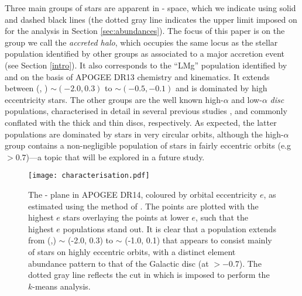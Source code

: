Three main groups of stars are apparent in \mgfe{}-\feh{} space,
which we indicate using solid and dashed black lines (the dotted
gray line indicates the upper limit imposed on \feh{} for the
analysis in Section \ref{sec:abundances}).  The focus of this paper
is on the group we call the \textit{accreted halo}, which occupies
the same locus as the stellar population identified by other groups
as associated to a major accretion event (see Section \ref{intro}).
It also corresponds to the ``LMg'' population identified by
\citet{2018ApJ...852...49H} and\citet{2018ApJ...852...50F} on the
basis of APOGEE DR13 chemistry and kinematics.  It extends between
(\feh{}, \mgfe{}) $\sim(-2.0, 0.3)$ to $\sim (-0.5, -0.1)$ and is
dominated by high eccentricity stars.  The other groups are the
well known high-$\alpha$ and low-$\alpha$ {\it disc} populations,
characterised in detail in several previous studies
\citep[e.g.][]{2014ApJ...796...38N,2015ApJ...808..132H,2015MNRAS.453.1855M,2017arXiv170600018M},
and commonly conflated with the thick and thin discs, respectively.
As expected, the latter populations are dominated by stars in very
circular orbits, although the high-$\alpha$ group contains a
non-negligible population of stars in fairly eccentric orbits (e.g
$> 0.7$)---a topic that will be explored in a future study.

\begin{figure*}
\texttt{[image: characterisation.pdf]}
\caption{\label{fig:characterisation} The \mgfe{}-\feh{} plane in
APOGEE DR14, coloured by orbital eccentricity $e$, as estimated
using the method of \citet{2018arXiv180202592M}. The points are
plotted with the highest $e$ stars overlaying the points at lower
$e$, such that the highest $e$ populations stand out. It is clear
that a population extends from (\feh{},\mgfe{}) $\sim$  (-2.0, 0.3)
to $\sim$ (-1.0, 0.1) that appears to consist mainly of stars on
highly eccentric orbits, with a distinct element abundance pattern
to that of the Galactic disc (at \feh{}$>-0.7$). The dotted gray
line reflects the cut in \feh{} which is imposed to perform the
$k$-means analysis.}
\end{figure*}

